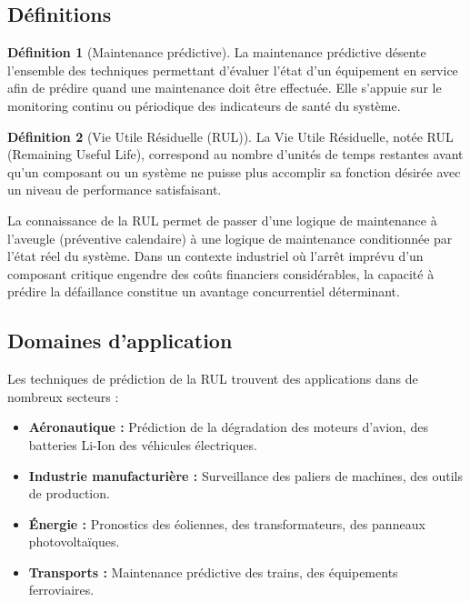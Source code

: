 \documentclass[12pt,a4paper]{report}
\theoremstyle{definition}
\newtheorem{definition}{Définition}[chapter]
\begin{document}
\subsection{Définitions}

\begin{definition}[Maintenance prédictive]
La maintenance prédictive désente l'ensemble des techniques permettant d'évaluer l'état d'un équipement en service afin de prédire quand une maintenance doit être effectuée. Elle s'appuie sur le monitoring continu ou périodique des indicateurs de santé du système.
\end{definition}

\begin{definition}[Vie Utile Résiduelle (RUL)]
La Vie Utile Résiduelle, notée RUL (Remaining Useful Life), correspond au nombre d'unités de temps restantes avant qu'un composant ou un système ne puisse plus accomplir sa fonction désirée avec un niveau de performance satisfaisant.
\end{definition}

La connaissance de la RUL permet de passer d'une logique de maintenance \og à l'aveugle \fg{} (préventive calendaire) à une logique de maintenance conditionnée par l'état réel du système. Dans un contexte industriel où l'arrêt imprévu d'un composant critique engendre des coûts financiers considérables, la capacité à prédire la défaillance constitue un avantage concurrentiel déterminant.

\subsection{Domaines d'application}

Les techniques de prédiction de la RUL trouvent des applications dans de nombreux secteurs :
\begin{itemize}
    \item \textbf{Aéronautique :} Prédiction de la dégradation des moteurs d'avion, des batteries Li-Ion des véhicules électriques.
    \item \textbf{Industrie manufacturière :} Surveillance des paliers de machines, des outils de production.
    \item \textbf{Énergie :} Pronostics des éoliennes, des transformateurs, des panneaux photovoltaïques.
    \item \textbf{Transports :} Maintenance prédictive des trains, des équipements ferroviaires.
\end{itemize}
\end{document}
